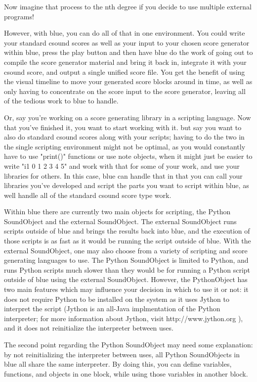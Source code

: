 Now imagine that process to the nth degree if you decide to use multiple
external programs!

However, with blue, you can do all of that in one environment. You could
write your standard csound scores as well as your input to your chosen
score generator within blue, press the play button and then have blue do
the work of going out to compile the score generator material and bring
it back in, integrate it with your csound score, and output a single
unified score file. You get the benefit of using the visual timeline to
move your generated score blocks around in time, as well as only having
to concentrate on the score input to the score generator, leaving all of
the tedious work to blue to handle.

Or, say you're working on a score generating library in a scripting
language. Now that you've finished it, you want to start working with
it. but say you want to also do standard csound scores along with your
scripts; having to do the two in the single scripting environment might
not be optimal, as you would constantly have to use "print()" functions
or use note objects, when it might just be easier to write "i1 0 1 2 3 4
5" and work with that for some of your work, and use your libraries for
others. In this case, blue can handle that in that you can call your
libraries you've developed and script the parts you want to script
within blue, as well handle all of the standard csound score type work.

Within blue there are currently two main objects for scripting, the
Python SoundObject and the external SoundObject. The external
SoundObject runs scripts outside of blue and brings the results back
into blue, and the execution of those scripts is as fast as it would be
running the script outside of blue. With the external SoundObject, one
may also choose from a variety of scripting and score generating
languages to use. The Python SoundObject is limited to Python, and runs
Python scripts much slower than they would be for running a Python
script outside of blue using the external SoundObject. However, the
PythonObject has two main features which may influence your decision in
which to use it or not: it does not require Python to be installed on
the system as it uses Jython to interpret the script (Jython is an
all-Java implmentation of the Python interpreter; for more information
about Jython, visit http://www.jython.org ), and it does not
reinitialize the interpreter between uses.

The second point regarding the Python SoundObject may need some
explanation: by not reinitializing the interpreter between uses, all
Python SoundObjects in blue all share the same interpreter. By doing
this, you can define variables, functions, and objects in one block,
while using those variables in another block.

